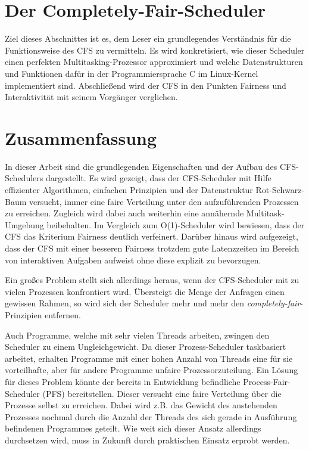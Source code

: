\documentclass[ngerman]{seminarvorlage}
\begin{document}






\section{Der Completely-Fair-Scheduler}\label{s:cfsmain}
Ziel dieses Abschnittes ist es, dem Leser ein grundlegendes Verständnis für die Funktionsweise des CFS zu vermitteln. Es wird konkretisiert, wie dieser Scheduler einen perfekten Multitasking-Prozessor approximiert und welche Datenstrukturen und Funktionen dafür in der Programmiersprache C im Linux-Kernel implementiert sind. Abschließend wird der CFS in den Punkten Fairness und Interaktivität mit seinem Vorgänger verglichen.





\section{Zusammenfassung}\label{s:end}
In dieser Arbeit sind die grundlegenden Eigenschaften und der Aufbau des CFS-Schedulers dargestellt. Es wird gezeigt, dass der CFS-Scheduler mit Hilfe effizienter Algorithmen, einfachen Prinzipien und der Datenstruktur Rot-Schwarz-Baum versucht, immer eine faire Verteilung unter den aufzuführenden Prozessen zu erreichen. Zugleich wird dabei auch weiterhin eine annähernde Multitask-Umgebung beibehalten. Im Vergleich zum O(1)-Scheduler wird bewiesen, dass der CFS das Kriterium Fairness deutlich verfeinert. Darüber hinaus wird aufgezeigt, dass der CFS mit einer besseren Fairness trotzdem gute Latenzzeiten im Bereich von interaktiven Aufgaben aufweist ohne diese explizit zu bevorzugen.

Ein großes Problem stellt sich allerdings heraus, wenn der CFS-Scheduler mit zu vielen Prozessen konfrontiert wird. Über\-steigt die Menge der Anfragen einen gewissen Rahmen, so wird sich der Scheduler mehr und mehr den  \textit{com\-pletely-fair}-Prinzipien entfernen.  

Auch Programme, welche mit sehr vielen Threads arbeiten, zwingen den Scheduler zu einem Ungleichgewicht. Da dieser Prozess-Scheduler taskbasiert arbeitet, erhalten Programme mit einer hohen Anzahl von Threads eine für sie vorteilhafte, aber für andere Programme unfaire Prozessorzuteilung. Ein Lösung für dieses Problem könnte der bereits in Entwicklung befindliche Process-Fair-Scheduler (PFS) bereitstellen. Dieser versucht eine faire Verteilung über die Prozesse selbst zu erreichen. Dabei wird z.B. das Gewicht des anstehenden Prozesses nochmal durch die Anzahl der Threads des sich gerade in Ausführung befindenen Programmes geteilt. Wie weit sich dieser Ansatz allerdings durchsetzen wird, muss in Zukunft durch praktischen Einsatz erprobt werden.
\end{document}

